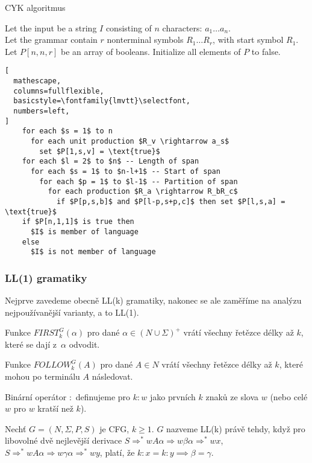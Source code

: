 \begin{algorithm}[H]
\caption{CYK algoritmus}
Let the input be a string $I$ consisting of $n$ characters: $a_1\dots a_n$.\\
Let the grammar contain $r$ nonterminal symbols $R_1\dots R_r$, with start symbol $R_1$.\\
Let $P[n,n,r]$ be an array of booleans. Initialize all elements of $P$ to false.
\begin{lstlisting}[
  mathescape,
  columns=fullflexible,
  basicstyle=\fontfamily{lmvtt}\selectfont,
  numbers=left,
]
    for each $s = 1$ to n
      for each unit production $R_v \rightarrow a_s$
        set $P[1,s,v] = \text{true}$
    for each $l = 2$ to $n$ -- Length of span
      for each $s = 1$ to $n-l+1$ -- Start of span
        for each $p = 1$ to $l-1$ -- Partition of span
          for each production $R_a \rightarrow R_bR_c$
            if $P[p,s,b]$ and $P[l-p,s+p,c]$ then set $P[l,s,a] = \text{true}$
    if $P[n,1,1]$ is true then
      $I$ is member of language
    else
      $I$ is not member of language
\end{lstlisting}
\end{algorithm}

\subsubsection{LL(1) gramatiky}


Nejprve zavedeme obecně LL(k) gramatiky, nakonec se ale zaměříme na
analýzu nejpoužívanější varianty, a to LL(1).

\begin{definition}
    Funkce $FIRST^G_k(\alpha)$ pro dané $\alpha \in (N \cup \Sigma)^+$
    vrátí všechny řetězce délky až $k$, které se dají z~$\alpha$
    odvodit.

    Funkce $FOLLOW^G_k(A)$ pro dané $A \in N$
    vrátí všechny řetězce délky až $k$, které mohou po terminálu $A$
    následovat.

    Binární operátor ${:}$ definujeme pro $k : w$ jako prvních $k$ znaků
    ze slova $w$ (nebo celé $w$ pro $w$ kratší než $k$).
\end{definition}

\begin{definition}
    Nechť $G = (N, \Sigma, P, S)$ je CFG, $k \geq 1$. $G$ nazveme LL(k)
    právě tehdy, když pro libovolné dvě nejlevější derivace
    $S \Rightarrow^* wA\alpha \Rightarrow w\beta\alpha \Rightarrow^* wx$,
    $S \Rightarrow^* wA\alpha \Rightarrow w\gamma\alpha \Rightarrow^* wy$,
    platí, že $k : x = k : y \implies \beta = \gamma$.
\end{definition}

